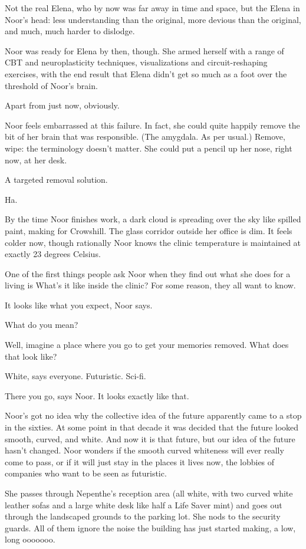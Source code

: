 \documentclass[12pt,a5paper]{book}
\newcommand{\storybreak}{%
  \par\vspace{0.6\baselineskip}
  \begin{center}\color{coveraccent}\small *\enspace *\enspace *\end{center}
  \vspace{0.3\baselineskip}\noindent\ignorespaces
}
\begin{document}
Not the real Elena, who by now was far away in time and space, but the Elena in Noor's head: less understanding than the original, more devious than the original, and much, much harder to dislodge.

Noor was ready for Elena by then, though. She armed herself with a range of CBT and neuroplasticity techniques, visualizations and circuit-reshaping exercises, with the end result that Elena didn't get so much as a foot over the threshold of Noor's brain.

Apart from just now, obviously.

Noor feels embarrassed at this failure. In fact, she could quite happily remove the bit of her brain that was responsible. (The amygdala. As per usual.) Remove, wipe: the terminology doesn't matter. She could put a pencil up her nose, right now, at her desk.

A targeted removal solution.

Ha.

\storybreak

By the time Noor finishes work, a dark cloud is spreading over the sky like spilled paint, making for Crowshill. The glass corridor outside her office is dim. It feels colder now, though rationally Noor knows the clinic temperature is maintained at exactly 23 degrees Celsius.

One of the first things people ask Noor when they find out what she does for a living is What's it like inside the clinic? For some reason, they all want to know.

It looks like what you expect, Noor says.

What do you mean?

Well, imagine a place where you go to get your memories removed. What does that look like?

White, says everyone. Futuristic. Sci-fi.

There you go, says Noor. It looks exactly like that.

Noor's got no idea why the collective idea of the future apparently came to a stop in the sixties. At some point in that decade it was decided that the future looked smooth, curved, and white. And now it is that future, but our idea of the future hasn't changed. Noor wonders if the smooth curved whiteness will ever really come to pass, or if it will just stay in the places it lives now, the lobbies of companies who want to be seen as futuristic.

She passes through Nepenthe's reception area (all white, with two curved white leather sofas and a large white desk like half a Life Saver mint) and goes out through the landscaped grounds to the parking lot. She nods to the security guards. All of them ignore the noise the building has just started making, a low, long ooooooo.
\end{document}
